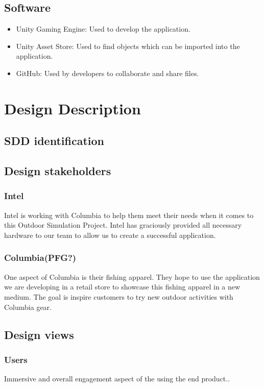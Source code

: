 \documentclass[10pt,journal,compsoc,onecolumn, draftclsnofoot]{IEEEtran}
\begin{document}
\subsection{Software}
\begin{itemize}
  \item Unity Gaming Engine: Used to develop the application.
  \item Unity Asset Store: Used to find objects which can be imported into the application.
  \item GitHub: Used by developers to collaborate and share files.
\end{itemize}


\section{Design Description}
\subsection{SDD identification}

\subsection{Design stakeholders}

\subsubsection{Intel}
Intel is working with Columbia to help them meet their needs when it comes to this Outdoor Simulation Project. Intel has graciously provided all necessary hardware to our team to allow us to create a successful application.

\subsubsection{Columbia(PFG?)}
One aspect of Columbia is their fishing apparel. They hope to use the application we are developing in a retail store to showcase this fishing apparel in a new medium. The goal is inspire customers to try new outdoor activities with Columbia gear.

\subsection{Design views}
\subsubsection{Users}
Immersive and overall engagement aspect of the using the end product..
\end{document}
